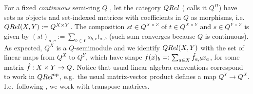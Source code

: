 For a fixed \emph{continuous} semi-ring $Q$ \cite[Def. II.5]{Manzo2013}, let the category $\QREL$ (\cite{Manzo2013} calls it $Q^\Pi$) have sets as objects and set-indexed matrices with coefficients in $Q$ as morphisms, i.e.~$\QREL(X,Y):=Q^{X\times Y}$.
The composition $st\in Q^{X\times Z}$ of $t\in Q^{X\times Y}$ and $s\in Q^{Y\times Z}$ is given by $(st)_{a,c}:=\sum_{b\in Y} s_{b,c}t_{a,b}$ (such sum converges because $Q$ is continuous).
As expected, $Q^X$ is a $Q$-semimodule and we identify $\HOM{\QREL}{X}{Y}$ with the set of linear maps from $Q^X$ to $Q^Y$, which have shape $f(x)_b=:\sum_{a\in X} \hat{f}_{a,b}x_a$, for some matrix $\hat{f}:X\times Y\to Q$.
% 
Notice that usual linear algebra conventions correspond to work in $\QREL^{\op}$, %
e.g.\ the usual matrix-vector product defines a map $Q^Y\to Q^X$.
I.e.\ following \cite{Manzo2013, Hofmann2014, Ehrhard2005}, we work with transpose matrices.
%
%
%
%

